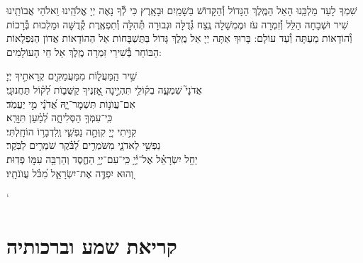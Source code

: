 \documentclass[twoside, openany, parskip=half, 11pt]{book}
\begin{document}
שִׁמְךָ לָעַד מַלְכֵּֽנוּ הָאֵל הַמֶּֽלֶךְ הַגָּדוֹל וְ֯הַקָּדוֹשׁ בַּשָׁמַֽיִם וּבָאָֽרֶץ כִּי לְ֯ךָ נָאֶה יְיָ אֱלֹהֵֽינוּ וֵאלֹהֵי אֲבוֹתֵֽינוּ שִׁיר וּשְׁבָחָה הַלֵּל וְ֯זִמְרָה עֹז וּמֶמְשָׁלָה נֶֽצַח גְּ֯דֻלָּה וּגְבוּרָה תְּ֯הִלָּה וְ֯תִפְאֶֽרֶת קְ֯דֻשָּׁה וּמַלְכוּת בְּ֯רָכוֹת וְ֯הוֹדָאוֹת מֵעַתָּה וְ֯עַד עוֹלָם: בָּרוּךְ אַתָּה יְיָ אֵל מֶֽלֶךְ גָּדוֹל בַּתֻּשְׁבָּחוֹת אֵל הַהוֹדָאוֹת אֲדוֹן הַנִּפְלָאוֹת הַבּוֹחֵר בְּ֯שִׁירֵי זִמְרָה מֶֽלֶךְ אֵל חֵי הָעוֹלָמִים:
\newcommand{\mimaamakim}{
\begin{narrow}
\instruction{בעשי״ת:}
שִׁ֥יר הַֽמַּעֲל֑וֹת מִמַּעֲמַקִּ֖ים קְרָאתִ֣יךָ יְיָ׃\\
אֲדֹנָי֮ שִׁמְעָ֢ה בְק֫וֹלִ֥י תִּהְיֶ֣ינָה אׇ֭זְנֶיךָ קַשֻּׁב֑וֹת לְ֝ק֗וֹל תַּחֲנוּנָֽי׃\\
אִם־עֲוֺנ֥וֹת תִּשְׁמׇר־יָ֑הּ אֲ֝דֹנָ֗י מִ֣י יַעֲמֹֽד׃\\
כִּֽי־עִמְּךָ֥ הַסְּלִיחָ֑ה לְ֝מַ֗עַן תִּוָּרֵֽא׃\\
קִוִּ֣יתִי יְיָ֭ קִוְּתָ֣ה נַפְשִׁ֑י וְֽלִדְבָר֥וֹ הוֹחָֽלְתִּי׃\\
נַפְשִׁ֥י לַאדֹנָ֑י מִשֹּׁמְרִ֥ים לַ֝בֹּ֗קֶר שֹׁמְרִ֥ים לַבֹּֽקֶר׃\\
יַחֵ֥ל יִשְׂרָאֵ֗ל אֶל־יְ֫יָ֥ כִּֽי־עִם־יְיָ֥ הַחֶ֑סֶד וְהַרְבֵּ֖ה עִמּ֣וֹ פְדֽוּת׃\\
וְ֭הוּא יִפְדֶּ֣ה אֶת־יִשְׂרָאֵ֑ל מִ֝כֹּ֗ל עֲוֺנֹתָֽיו׃ \\
\end{narrow}
}
\mimaamakim
\halfkaddish

\enlargethispage{\baselineskip}

`\vspace{1.25\baselineskip}
\chapter[שחרית לחול]{קריאת שמע וברכותיה}
\end{document}

